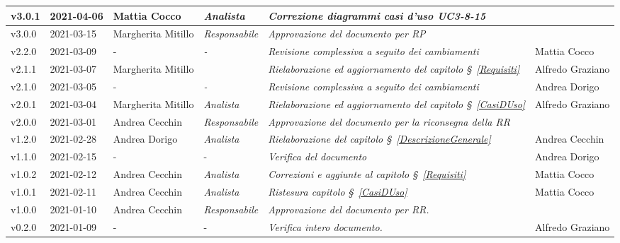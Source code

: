 {\begin{center}
\begin{longtable}[c]{|p{2cm-1\tabcolsep}|p{2cm}|p{3cm-2\tabcolsep}|p{}|p{}|p{3cm}|}
		\hline
		\centering v3.0.1 & 2021-04-06 & Mattia Cocco & \centering \textit{Analista} & \textit{Correzione diagrammi casi d'uso UC3-8-15} & \makecell[c]{Emma Roveroni}\\
		\hline
		\centering v3.0.0 & 2021-03-15 & Margherita Mitillo & \centering \textit{Responsabile} & \textit{Approvazione del documento per RP} & \makecell[c]{-}\\
		\hline
		\centering v2.2.0 & 2021-03-09 &\centering - & \centering \textit{-} &\textit{Revisione complessiva a seguito dei cambiamenti} & Mattia Cocco\\
		\hline
		\centering v2.1.1 & 2021-03-07 & Margherita Mitillo & \centering{ \textit{Analista} }&\textit{Rielaborazione ed aggiornamento del capitolo \S~\ref{Requisiti}} &  Alfredo Graziano  \\
		\hline
		\centering v2.1.0 & 2021-03-05 &\centering - & \centering \textit{-} &  \textit{Revisione complessiva a seguito dei cambiamenti}  & Andrea Dorigo\\
		\hline
		\centering v2.0.1 & 2021-03-04 & Margherita Mitillo & \centering \textit{Analista} &\textit{Rielaborazione ed aggiornamento del capitolo \S~\ref{CasiDUso}} & Alfredo Graziano  \\
		\hline
		\centering v2.0.0 & 2021-03-01 & Andrea Cecchin & \centering \textit{Responsabile} &\textit{Approvazione del documento per la riconsegna della RR} &  \makecell[c]{-}\\
		\hline
		\centering v1.2.0 & 2021-02-28 & Andrea Dorigo & \centering \textit{Analista} &\textit{Rielaborazione del capitolo \S~\ref{DescrizioneGenerale}} & Andrea Cecchin  \\
		\hline
		\centering v1.1.0 & 2021-02-15 & \centering - & \centering - &\textit{Verifica del documento} & Andrea Dorigo  \\
		\hline
		\centering v1.0.2 & 2021-02-12 & Andrea Cecchin & \centering \textit{Analista} &\textit{Correzioni e aggiunte al capitolo \S~\ref{Requisiti}} & Mattia Cocco  \\
		\hline
		\centering v1.0.1 & 2021-02-11 & Andrea Cecchin & \centering \textit{Analista} &\textit{Ristesura capitolo \S~\ref{CasiDUso}} & Mattia Cocco  \\
		\hline
		\centering v1.0.0 & 2021-01-10 & Andrea Cecchin & \centering \textit{Responsabile} &\textit{Approvazione del documento per RR.} &  \makecell[c]{-}  \\
		\hline
		\centering v0.2.0 & 2021-01-09 & \centering - & \centering - &\textit{Verifica intero documento.} & Alfredo Graziano  \\

\end{longtable}
\end{center}}
